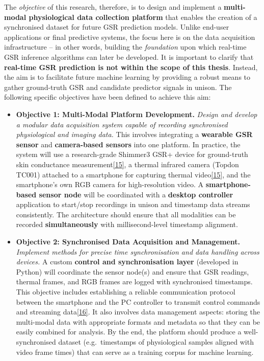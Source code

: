 \documentclass[12pt,a4paper]{article}
\begin{document}
The \emph{objective} of this research, therefore, is to design and implement a \textbf{multi-modal physiological data collection platform} that enables the creation of a synchronised dataset for future GSR prediction models. Unlike end-user applications or final predictive systems, the focus here is on the data acquisition infrastructure -- in other words, building the \emph{foundation} upon which real-time GSR inference algorithms can later be developed. It is important to clarify that \textbf{real-time GSR prediction is not within the scope of this thesis}. Instead, the aim is to facilitate future machine learning by providing a robust means to gather ground-truth GSR and candidate predictor signals in unison. The following specific objectives have been defined to achieve this aim:

\begin{itemize}
\item
  \textbf{Objective 1: Multi-Modal Platform Development.} \emph{Design and develop a modular data acquisition system capable of recording synchronised physiological and imaging data.} This involves integrating a \textbf{wearable GSR sensor} and \textbf{camera-based sensors} into one platform. In practice, the system will use a research-grade Shimmer3 GSR+ device for ground-truth skin conductance measurement\href{docs/thesis_report/draft/bibliography.md\#L2-L5}{{[}15{]}}, a thermal infrared camera (Topdon TC001) attached to a smartphone for capturing thermal video\href{docs/thesis_report/draft/bibliography.md\#L2-L5}{{[}15{]}}, and the smartphone's own RGB camera for high-resolution video. A \textbf{smartphone-based sensor node} will be coordinated with a \textbf{desktop controller} application to start/stop recordings in unison and timestamp data streams consistently. The architecture should ensure that all modalities can be recorded \textbf{simultaneously} with millisecond-level timestamp alignment.
\item
  \textbf{Objective 2: Synchronised Data Acquisition and Management.} \emph{Implement methods for precise time synchronisation and data handling across devices.} A custom \textbf{control and synchronisation layer} (developed in Python) will coordinate the sensor node(s) and ensure that GSR readings, thermal frames, and RGB frames are logged with synchronised timestamps. This objective includes establishing a reliable communication protocol between the smartphone and the PC controller to transmit control commands and streaming data\href{AndroidApp/README.md\#L2-L5}{{[}16{]}}. It also involves data management aspects: storing the multi-modal data with appropriate formats and metadata so that they can be easily combined for analysis. By the end, the platform should produce a well-synchronised dataset (e.g.~timestamps of physiological samples aligned with video frame times) that can serve as a training corpus for machine learning.

\end{itemize}
\end{document}
